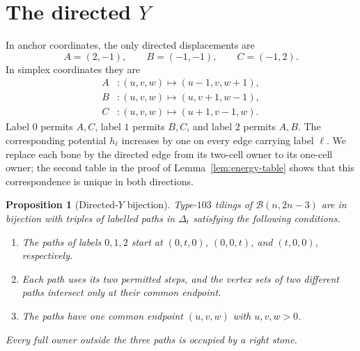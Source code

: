 \documentclass[11pt]{amsart}
\newtheorem{proposition}[theorem]{Proposition}
\theoremstyle{definition}
\newcommand{\Bz}{\mathcal B}
\begin{document}
\section{The directed \texorpdfstring{$Y$}{Y}}

In anchor coordinates, the only directed displacements are
\[
 A=(2,-1),\qquad B=(-1,-1),\qquad C=(-1,2).
\]
In simplex coordinates they are
\begin{align*}
 A&:(u,v,w)\longmapsto(u-1,v,w+1),\\
 B&:(u,v,w)\longmapsto(u,v+1,w-1),\\
 C&:(u,v,w)\longmapsto(u+1,v-1,w).
\end{align*}
Label $0$ permits $A,C$, label $1$ permits $B,C$, and label $2$ permits
$A,B$.  The corresponding potential $h_\ell$ increases by one on every
edge carrying label $\ell$.  We replace each bone by the directed edge from
its two-cell owner to its one-cell owner; the second table in the proof of
Lemma~\ref{lem:energy-table} shows that this correspondence is unique in both
directions.

\begin{proposition}[Directed-$Y$ bijection]\label{prop:Y-bijection}
Type-$103$ tilings of $\Bz(n,2n-3)$ are in bijection with triples of labelled
paths in $\Delta_t$ satisfying the following conditions.
\begin{enumerate}
\item The paths of labels $0,1,2$ start at $(0,t,0)$, $(0,0,t)$, and
      $(t,0,0)$, respectively.
\item Each path uses its two permitted steps, and the vertex sets of two
      different paths intersect only at their common endpoint.
\item The paths have one common endpoint $(u,v,w)$ with $u,v,w>0$.
\end{enumerate}
Every full owner outside the three paths is occupied by a right stone.
\end{proposition}
\end{document}
